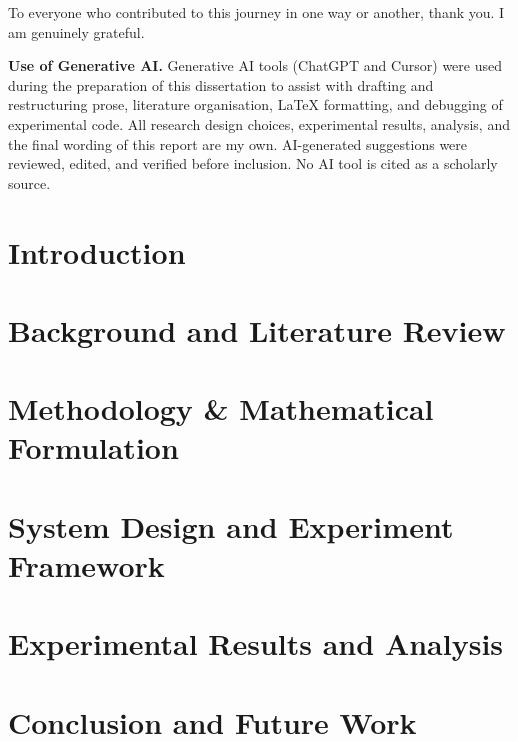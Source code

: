 \documentclass[11pt,a4paper,openany]{report}
\begin{document}
To everyone who contributed to this journey in one way or another, thank
you. I am genuinely grateful.

\textbf{Use of Generative AI.} Generative AI tools (ChatGPT and Cursor)
were used during the preparation of this dissertation to assist with
drafting and restructuring prose, literature organisation, LaTeX
formatting, and debugging of experimental code. All research design
choices, experimental results, analysis, and the final wording of this
report are my own. AI-generated suggestions were reviewed, edited, and
verified before inclusion. No AI tool is cited as a scholarly source.

\clearpage

\setcounter{tocdepth}{1} %
\tableofcontents
\clearpage

\listoffigures
{}
\clearpage

\listoftables
{}
\clearpage


\chapter{Introduction}


\chapter{Background and Literature Review}


\chapter{Methodology \& Mathematical Formulation}


\chapter{System Design and Experiment Framework}


\chapter{Experimental Results and Analysis}


\chapter{Conclusion and Future Work}

\end{document}
